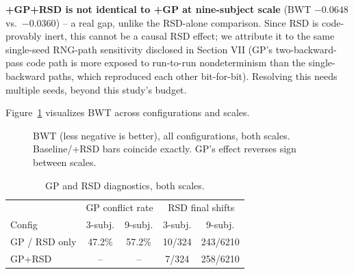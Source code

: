 \documentclass[conference]{IEEEtran}
\begin{document}
\textbf{+GP+RSD is not identical to +GP at nine-subject scale} (BWT $-0.0648$ vs.\ $-0.0360$) -- a real gap, unlike the RSD-alone comparison. Since RSD is code-provably inert, this cannot be a causal RSD effect; we attribute it to the same single-seed RNG-path sensitivity disclosed in Section VII (GP's two-backward-pass code path is more exposed to run-to-run nondeterminism than the single-backward paths, which reproduced each other bit-for-bit). Resolving this needs multiple seeds, beyond this study's budget.

Figure~\ref{fig:bwt} visualizes BWT across configurations and scales.

\begin{figure}[t]
\centering
{}
\caption{BWT (less negative is better), all configurations, both scales. Baseline/+RSD bars coincide exactly. GP's effect reverses sign between scales.}
\label{fig:bwt}
\end{figure}

\begin{table}[t]
\caption{GP and RSD diagnostics, both scales.}
\label{tab:diag}
\centering
\small
\begin{tabular}{@{}lcccc@{}}
\toprule
& \multicolumn{2}{c}{GP conflict rate} & \multicolumn{2}{c}{RSD final shifts} \\
Config & 3-subj. & 9-subj. & 3-subj. & 9-subj. \\
\midrule
GP / RSD only & 47.2\% & 57.2\% & 10/324 & 243/6210 \\
GP+RSD & --\hphantom{0.0\%} & --\hphantom{0.0\%} & 7/324 & 258/6210 \\
\bottomrule
\end{tabular}
\end{table}
\end{document}
